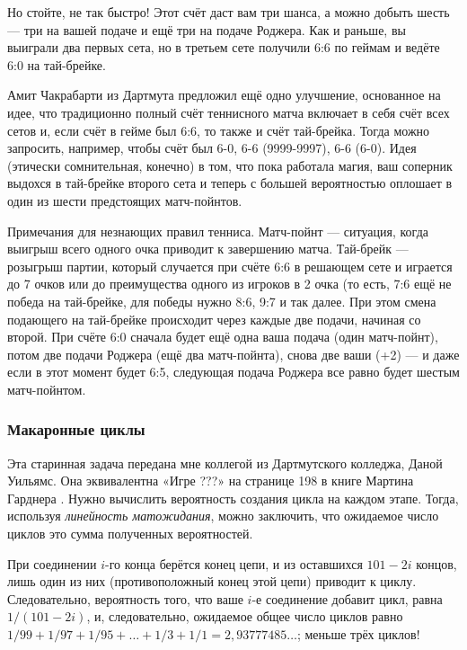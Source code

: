 Но стойте, не так быстро!
Этот счёт даст вам три шанса, а можно добыть шесть --- три на вашей подаче и ещё три на подаче Роджера.
Как и раньше, вы выиграли два первых сета, но в третьем сете получили 6:6 по геймам и ведёте 6:0 на тай-брейке.

Амит Чакрабарти из Дартмута предложил ещё одно улучшение, основанное на идее, что традиционно полный счёт теннисного матча включает в себя счёт всех сетов и, если счёт в гейме был 6:6, то также и счёт тай-брейка.
Тогда можно запросить, например, чтобы счёт был 6-0, 6-6 (9999-9997), 6-6 (6-0).
Идея (этически сомнительная, конечно) в том, что пока работала магия, ваш соперник выдохся в тай-брейке второго сета и теперь с большей вероятностью оплошает в один из шести предстоящих матч-пойнтов.

\begin{addedbytheeditors}
Примечания для незнающих правил тенниса.
Матч-пойнт --- ситуация, когда выигрыш всего одного очка приводит к завершению матча.
Тай-брейк --- розыгрыш партии, который
случается при счёте 6:6 в решающем сете и играется до 7 очков или до
преимущества
одного из игроков в 2 очка (то есть, 7:6 ещё не победа на тай-брейке, для победы нужно 8:6, 9:7 и так далее. При этом смена подающего на тай-брейке происходит через каждые две подачи, начиная со второй.
При счёте 6:0 сначала будет ещё одна ваша подача (один матч-пойнт), потом две подачи Роджера (ещё два матч-пойнта), снова две ваши (+2) --- и даже если в этот момент будет 6:5, следующая подача Роджера все равно будет
шестым матч-пойнтом.
\end{addedbytheeditors}

\subsubsection*{Макаронные циклы}

Эта старинная задача передана мне коллегой из Дартмутского колледжа, Даной Уильямс.
Она эквивалентна «Игре ???» на странице 198 в книге Мартина Гарднера \cite{gardner1971}.
Нужно вычислить вероятность создания цикла на каждом этапе.
Тогда, используя \emph{линейность матожидания}, можно заключить, что ожидаемое число циклов это сумма полученных вероятностей.

При соединении $i$-го конца берётся конец цепи, и из оставшихся $101 - 2i$ концов, лишь один из них (противоположный конец этой цепи) приводит к циклу.
Следовательно, вероятность того, что ваше $i$-е соединение добавит цикл, равна $1/(101 - 2i)$, и, следовательно, ожидаемое общее число циклов равно $1/99 + 1/97 + 1/95 +\dots + 1/3 + 1/1 = 2{,}93777485\dots$; меньше трёх циклов!

